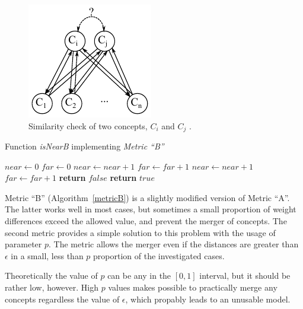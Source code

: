 \documentclass[graybox]{svmult}
\begin{document}
\begin{figure}[hbt]
  \sidecaption
  \includegraphics[scale=1]{similarity.pdf}
  \caption{Similarity check of two concepts, $C_i$ and $C_j$ \cite{hatwagner2018two}.}
  \label{fig:similarity}
\end{figure}

\begin{algorithm}
  \caption{Function \emph{isNearB} implementing \emph{Metric ``B''}}\label{metricB}
  \begin{algorithmic}[1]
      \State $near \gets 0$
      \State $far \gets 0$
            \State $near \gets near + 1$
          \Else
            \State $far \gets far + 1$
          \EndIf
            \State $near \gets near + 1$
          \Else
            \State $far \gets far + 1$
          \EndIf
        \EndIf
      \EndFor
        \State \textbf{return} $false$
      \Else
        \State \textbf{return} $true$
      \EndIf
    \EndFunction
  \end{algorithmic}
\end{algorithm}

Metric ``B'' (Algorithm~\ref{metricB}) is a slightly modified version of Metric ``A''. The latter works well in most cases, but sometimes a small proportion of weight differences exceed the allowed value, and prevent the merger of concepts. The second metric provides a simple solution to this problem with the usage of parameter $p$. The metric allows the merger even if the distances are greater than $\epsilon$ in a small, less than $p$ proportion of the investigated cases.

Theoretically the value of $p$ can be any in the $[0, 1]$ interval, but it should be rather low, however. High $p$ values makes possible to practically merge any concepts regardless the value of $\epsilon$, which propably leads to an unusable model.
\end{document}
